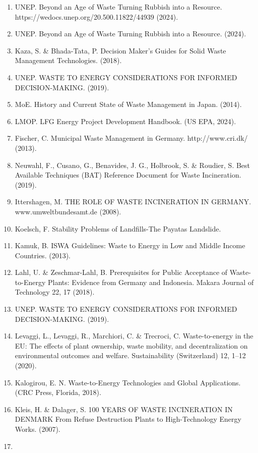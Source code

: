 \documentclass[
  letterpaper,
  DIV=11,
  numbers=noendperiod]{scrreprt}
\providecommand{\tightlist}{%
  \setlength{\itemsep}{0pt}\setlength{\parskip}{0pt}}
\begin{document}
\begin{enumerate}
\def\labelenumi{\arabic{enumi}.}
\tightlist
\item
  UNEP. Beyond an Age of Waste Turning Rubbish into a Resource.
  https://wedocs.unep.org/20.500.11822/44939 (2024).
\item
  UNEP. Beyond an Age of Waste Turning Rubbish into a Resource. (2024).
\item
  Kaza, S. \& Bhada-Tata, P. Decision Maker's Guides for Solid Waste
  Management Technologies. (2018).
\item
  UNEP. WASTE TO ENERGY CONSIDERATIONS FOR INFORMED DECISION-MAKING.
  (2019).
\item
  MoE. History and Current State of Waste Management in Japan. (2014).
\item
  LMOP. LFG Energy Project Development Handbook. (US EPA, 2024).
\item
  Fischer, C. Municipal Waste Management in Germany. http://www.cri.dk/
  (2013).
\item
  Neuwahl, F., Cusano, G., Benavides, J. G., Holbrook, S. \& Roudier, S.
  Best Available Techniques (BAT) Reference Document for Waste
  Incineration. (2019).
\item
  Ittershagen, M. THE ROLE OF WASTE INCINERATION IN GERMANY.
  www.umweltbundesamt.de (2008).
\item
  Koelsch, F. Stability Problems of Landfills-The Payatas Landslide.
\item
  Kamuk, B. ISWA Guidelines: Waste to Energy in Low and Middle Income
  Countries. (2013).
\item
  Lahl, U. \& Zeschmar-Lahl, B. Prerequisites for Public Acceptance of
  Waste-to-Energy Plants: Evidence from Germany and Indonesia. Makara
  Journal of Technology 22, 17 (2018).
\item
  UNEP. WASTE TO ENERGY CONSIDERATIONS FOR INFORMED DECISION-MAKING.
  (2019).
\item
  Levaggi, L., Levaggi, R., Marchiori, C. \& Trecroci, C.
  Waste-to-energy in the EU: The effects of plant ownership, waste
  mobility, and decentralization on environmental outcomes and welfare.
  Sustainability (Switzerland) 12, 1--12 (2020).
\item
  Kalogirou, E. N. Waste-to-Energy Technologies and Global Applications.
  (CRC Press, Florida, 2018).
\item
  Kleis, H. \& Dalager, S. 100 YEARS OF WASTE INCINERATION IN DENMARK
  From Refuse Destruction Plants to High-Technology Energy Works.
  (2007).
\item

\end{enumerate}
\end{document}
